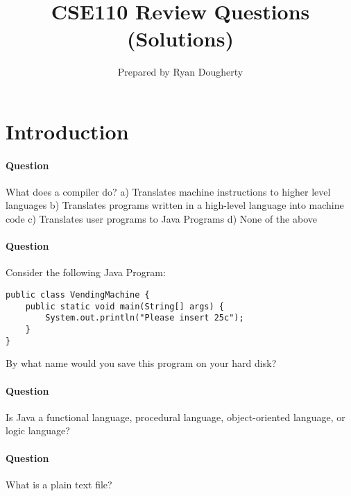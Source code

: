 \documentclass{article}
\title{CSE110 Review Questions (Solutions)}
\author{Prepared by Ryan Dougherty}
\date{}
\begin{document}
\maketitle

\section*{Introduction}

\setcounter{question_num}{1}
\paragraph{Question }
What does a compiler do?
\newline a) Translates machine instructions to higher level languages
\newline b) Translates programs written in a high-level language into machine code
\newline c) Translates user programs to Java Programs
\newline d) None of the above

\addtocounter{question_num}{1}
\paragraph{Question }
Consider the following Java Program:
\begin{lstlisting}
public class VendingMachine {
	public static void main(String[] args) {
		System.out.println("Please insert 25c");
	}
}
\end{lstlisting}
By what name would you save this program on your hard disk?

\addtocounter{question_num}{1}
\paragraph{Question }
Is Java a functional language, procedural language, object-oriented language, or logic language?

\addtocounter{question_num}{1}
\paragraph{Question }
What is a plain text file? 
\end{document}
